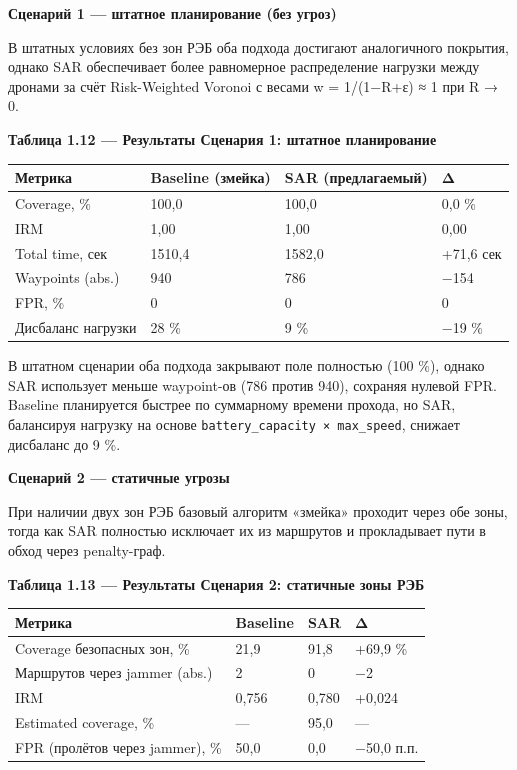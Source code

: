 \textbf{Сценарий 1 --- штатное планирование (без угроз)}

В штатных условиях без зон РЭБ оба подхода достигают аналогичного покрытия, однако SAR обеспечивает более равномерное распределение нагрузки между дронами за счёт Risk-Weighted Voronoi с весами w = 1/(1−R+ε) ≈ 1 при R → 0.

\textbf{Таблица 1.12 --- Результаты Сценария 1: штатное планирование}

\begin{longtable}[]{@{}llll@{}}
\toprule\noalign{}
Метрика & Baseline (змейка) & SAR (предлагаемый) & Δ \\
\midrule\noalign{}
\endhead
\bottomrule\noalign{}
\endlastfoot
Coverage, \% & 100,0 & 100,0 & 0,0 \% \\
IRM & 1,00 & 1,00 & 0,00 \\
Total time, сек & 1510,4 & 1582,0 & +71,6 сек \\
Waypoints (abs.) & 940 & 786 & −154 \\
FPR, \% & 0 & 0 & 0 \\
Дисбаланс нагрузки & 28 \% & 9 \% & −19 \% \\
\end{longtable}

В штатном сценарии оба подхода закрывают поле полностью (100 \%), однако SAR использует меньше waypoint-ов (786 против 940), сохраняя нулевой FPR. Baseline планируется быстрее по суммарному времени прохода, но SAR, балансируя нагрузку на основе \texttt{battery\_capacity\ ×\ max\_speed}, снижает дисбаланс до 9 \%.

\textbf{Сценарий 2 --- статичные угрозы}

При наличии двух зон РЭБ базовый алгоритм «змейка» проходит через обе зоны, тогда как SAR полностью исключает их из маршрутов и прокладывает пути в обход через penalty-граф.

\textbf{Таблица 1.13 --- Результаты Сценария 2: статичные зоны РЭБ}

\begin{longtable}[]{@{}llll@{}}
\toprule\noalign{}
Метрика & Baseline & SAR & Δ \\
\midrule\noalign{}
\endhead
\bottomrule\noalign{}
\endlastfoot
Coverage безопасных зон, \% & 21,9 & 91,8 & +69,9 \% \\
Маршрутов через jammer (abs.) & 2 & 0 & −2 \\
IRM & 0,756 & 0,780 & +0,024 \\
Estimated coverage, \% & --- & 95,0 & --- \\
FPR (пролётов через jammer), \% & 50,0 & 0,0 & −50,0 п.п. \\
\end{longtable}

